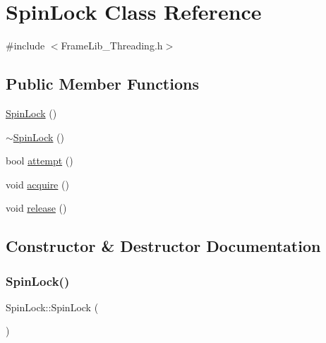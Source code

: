 \hypertarget{class_spin_lock}{}\section{Spin\+Lock Class Reference}
\label{class_spin_lock}


{\ttfamily \#include $<$Frame\+Lib\+\_\+\+Threading.\+h$>$}

\subsection*{Public Member Functions}
\begin{DoxyCompactItemize}
\item 
\hyperlink{class_spin_lock_a7dc17bb50466088acb8ea4a45d43b183}{Spin\+Lock} ()
\item 
\hyperlink{class_spin_lock_a8524b06bc92442aa10d7f5ba3d184e50}{$\sim$\+Spin\+Lock} ()
\item 
bool \hyperlink{class_spin_lock_a5c9211c6e3323218948c48e22623836f}{attempt} ()
\item 
void \hyperlink{class_spin_lock_ae35cf9e034be7ddced1fcfaefb0161ca}{acquire} ()
\item 
void \hyperlink{class_spin_lock_a7915866117b47f7e1e881a6363c943dd}{release} ()
\end{DoxyCompactItemize}


\subsection{Constructor \& Destructor Documentation}
\mbox{\label{class_spin_lock_a7dc17bb50466088acb8ea4a45d43b183}} 
\subsubsection{\texorpdfstring{Spin\+Lock()}{SpinLock()}}
{\footnotesize\ttfamily Spin\+Lock\+::\+Spin\+Lock (\begin{DoxyParamCaption}{ }\end{DoxyParamCaption})\hspace{0.3cm}{\ttfamily [inline]}}

\mbox{\label{class_spin_lock_a8524b06bc92442aa10d7f5ba3d184e50}} 
